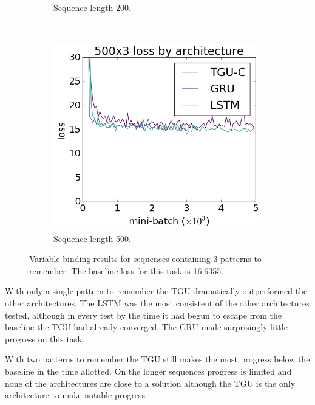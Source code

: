 \begin{figure}[htb]
\begin{subfigure}[t]{0.3\linewidth}
	\caption{Sequence length 200.}
\end{subfigure}~
\begin{subfigure}[t]{0.3\linewidth}
	\includegraphics[width=\linewidth]{exps/vbind/plots/500x3}
	\caption{Sequence length 500.}
\end{subfigure}

\caption[Variable binding results, three patterns]
{Variable binding results for sequences containing \(3\) patterns to remember. The baseline loss for this
task is 16.6355.}
\label{fig:vbindn3}
\end{figure}

With only a single pattern to remember the TGU dramatically outperformed the other
architectures. The LSTM was the most consistent of the other architectures tested,
although in every test by the time it had begun to escape from the baseline the TGU
had already converged. The GRU made surprisingly little progress on this
task.

With two patterns to remember the TGU still makes the most progress 
below the baseline in the time allotted.
On the longer sequences progress is limited and none of the architectures
are close to a solution although the TGU is the only architecture to
make notable progress.


